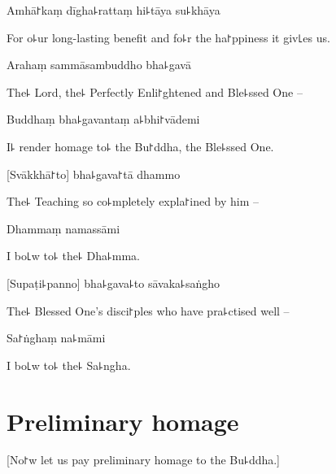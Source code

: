 Amhā꜓kaṃ dīgha꜕rattaṃ hi꜕tāya su꜕khāya

\begin{english}
For o꜕ur long-lasting benefit and fo꜕r the ha꜓ppiness it giv꜖es us.
\end{english}

\clearpage

Arahaṃ sammāsambuddho bha꜕gavā              %

\begin{english}
The꜕ Lord, the꜕ Perfectly Enli꜓ghtened and Ble꜕ssed One --
\end{english}

Buddhaṃ bha꜕gavantaṃ a꜕bhi꜓vādemi

\begin{english}
  I꜕ render homage to꜕ the Bu꜓ddha, the Ble꜕ssed One.
\end{english}

[Svākkhā꜓to] bha꜕gava꜓tā dhammo

\begin{english}
  The꜕ Teaching so co꜕mpletely expla꜓ined by him --
\end{english}

Dhammaṃ namassāmi

\begin{english}
  I bo꜖w to꜕ the꜕ Dha꜕mma.
\end{english}

[Supaṭi꜕panno] bha꜕gava꜕to sāvaka꜕saṅgho

\begin{english}
The꜕ Blessed One's disci꜓ples who have pra꜕ctised well --
\end{english}

Sa꜓ṅghaṃ na꜕māmi

\begin{english}
  I bo꜖w to꜕ the꜕ Sa꜕ngha.
\end{english}

\chapter[Namo Tassa]{Preliminary homage}            %

\begin{leader}
\end{leader}

\begin{english}
  [No꜓w let us pay preliminary homage to the Bu꜕ddha.]
\end{english}

